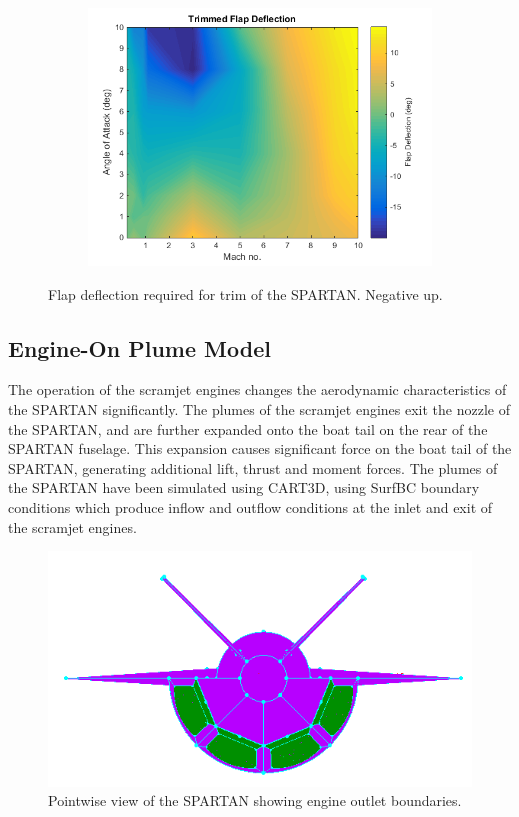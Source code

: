 \begin{figure}
\begin{subfigure}{.5\textwidth}
	\includegraphics[width=0.99\linewidth]{figures/3_vehicle_design/FlapDeflection}
	\caption{}
	\label{fig:FlapDeflectionEngineOff}
\end{subfigure}
\label{fig:FlapDeflection}
\caption{Flap deflection required for trim of the SPARTAN. Negative up.}
\end{figure}

\subsection{Engine-On Plume Model}\label{sec:engine-on}

The operation of the scramjet engines changes the aerodynamic characteristics of the SPARTAN significantly. 
The plumes of the scramjet engines exit the nozzle of the SPARTAN, and are further expanded onto the boat tail on the rear of the SPARTAN fuselage. This expansion causes significant force on the boat tail of the SPARTAN, generating additional lift, thrust and moment forces. The plumes of the SPARTAN have been simulated using CART3D, using SurfBC boundary conditions which produce inflow and outflow conditions at the inlet and exit of the scramjet engines\cite{Pandya2004}. 

\begin{figure}
	\centering
	\includegraphics[width=0.7\linewidth]{figures/3_vehicle_design/Pointwise-EngineBC}
	\caption{Pointwise view of the SPARTAN showing engine outlet boundaries.}
	\label{fig:Pointwise-EngineBC}
\end{figure}

